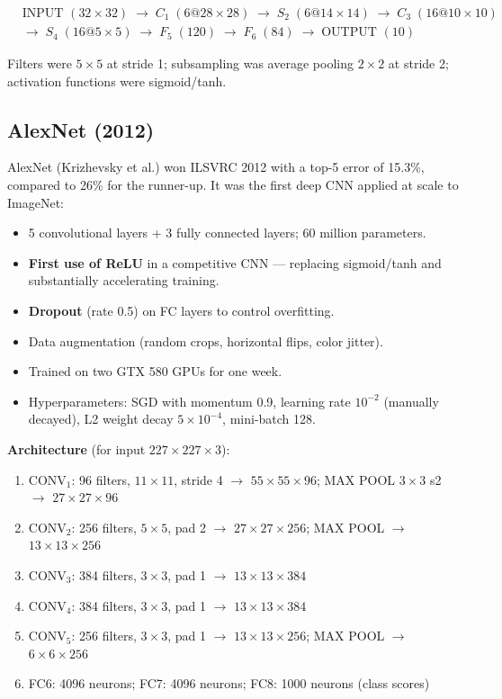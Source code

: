 \documentclass[11pt,a4paper]{article}
\theoremstyle{definition}
\theoremstyle{plain}
\theoremstyle{remark}
\begin{document}
\begin{align*}
    &\text{INPUT } (32\times32) \;\to\; C_1\;(6 @ 28\times28) \;\to\; S_2\;(6 @ 14\times14) \;\to\; C_3\;(16 @ 10\times10) \\
    &\to\; S_4\;(16 @ 5\times5) \;\to\; F_5\;(120) \;\to\; F_6\;(84) \;\to\; \text{OUTPUT }(10)
\end{align*}

Filters were $5 \times 5$ at stride 1; subsampling was average pooling $2 \times 2$ at stride 2; activation functions were sigmoid/tanh.

\subsection{AlexNet (2012)}

AlexNet (Krizhevsky et al.) won ILSVRC 2012 with a top-5 error of 15.3\%, compared to 26\% for the runner-up. It was the first deep CNN applied at scale to ImageNet:

\begin{itemize}
    \item 5 convolutional layers + 3 fully connected layers; 60 million parameters.
    \item \textbf{First use of ReLU} in a competitive CNN --- replacing sigmoid/tanh and substantially accelerating training.
    \item \textbf{Dropout} (rate 0.5) on FC layers to control overfitting.
    \item Data augmentation (random crops, horizontal flips, color jitter).
    \item Trained on two GTX 580 GPUs for one week.
    \item Hyperparameters: SGD with momentum 0.9, learning rate $10^{-2}$ (manually decayed), L2 weight decay $5 \times 10^{-4}$, mini-batch 128.
\end{itemize}

\textbf{Architecture} (for input $227 \times 227 \times 3$):
\begin{enumerate}
    \item $\text{CONV}_1$: 96 filters, $11\times11$, stride 4 $\to$ $55\times55\times96$; MAX POOL $3\times3$ s2 $\to$ $27\times27\times96$
    \item $\text{CONV}_2$: 256 filters, $5\times5$, pad 2 $\to$ $27\times27\times256$; MAX POOL $\to$ $13\times13\times256$
    \item $\text{CONV}_3$: 384 filters, $3\times3$, pad 1 $\to$ $13\times13\times384$
    \item $\text{CONV}_4$: 384 filters, $3\times3$, pad 1 $\to$ $13\times13\times384$
    \item $\text{CONV}_5$: 256 filters, $3\times3$, pad 1 $\to$ $13\times13\times256$; MAX POOL $\to$ $6\times6\times256$
    \item FC6: 4096 neurons; FC7: 4096 neurons; FC8: 1000 neurons (class scores)
\end{enumerate}
\end{document}
